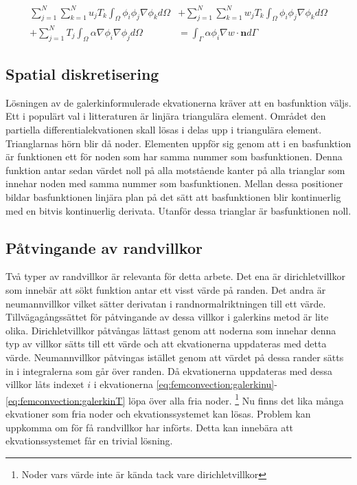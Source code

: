 \begin{align}
\label{eq:femconvection:galerkinT}
\sum^N_{j=1}\sum^N_{k=1}u_jT_k\int_\Omega \phi_i\phi_j\nabla\phi_k d\Omega &+
\sum^N_{j=1}\sum^N_{k=1}w_jT_k\int_\Omega \phi_i\phi_j\nabla\phi_k d\Omega \\ +
\nonumber
\sum^N_{j=1} T_j \int_\Omega \alpha\nabla\phi_i\nabla\phi_j d\Omega &=
\int_\Gamma \alpha\phi_i\nabla w \cdot \mathbf{n} d\Gamma
\end{align}

\subsection{Spatial diskretisering}

Lösningen av de galerkinformulerade ekvationerna kräver att en basfunktion väljs.
Ett i populärt val i litteraturen är linjära triangulära element. Området den
partiella differentialekvationen skall lösas i delas upp i triangulära element.
Trianglarnas hörn blir då noder. Elementen uppför sig genom att i en basfunktion
är funktionen ett för noden som har samma nummer som basfunktionen. Denna funktion
antar sedan värdet noll på alla motstående kanter på alla trianglar som innehar noden
med samma nummer som basfunktionen. Mellan dessa positioner bildar basfunktionen
linjära plan på det sätt att basfunktionen blir kontinuerlig med en bitvis kontinuerlig
derivata.
Utanför dessa trianglar är basfunktionen noll. \cite{johnson2009} 

\subsection{Påtvingande av randvillkor}

Två typer av randvillkor är relevanta för detta arbete. Det ena är dirichletvillkor som
innebär att sökt funktion antar ett visst värde på randen. Det andra är neumannvillkor 
vilket sätter derivatan i randnormalriktningen till ett värde. Tillvägagångssättet
för påtvingande av dessa villkor i galerkins metod är lite olika. Dirichletvillkor
påtvångas lättast genom att noderna som innehar denna typ av villkor sätts till ett värde
och att ekvationerna uppdateras med detta värde. Neumannvillkor påtvingas istället
genom att värdet på dessa rander sätts in i integralerna som går över randen. Då ekvationerna
uppdateras med dessa villkor låts indexet $i$ i ekvationerna
\eqref{eq:femconvection:galerkinu}-\eqref{eq:femconvection:galerkinT} löpa över alla fria noder.
\footnote{Noder vars värde inte är kända tack vare dirichletvillkor} Nu finns det
lika många ekvationer som fria noder och ekvationssystemet kan lösas. Problem
kan uppkomma om för få randvillkor har införts. Detta kan innebära att ekvationssystemet
får en trivial lösning.
